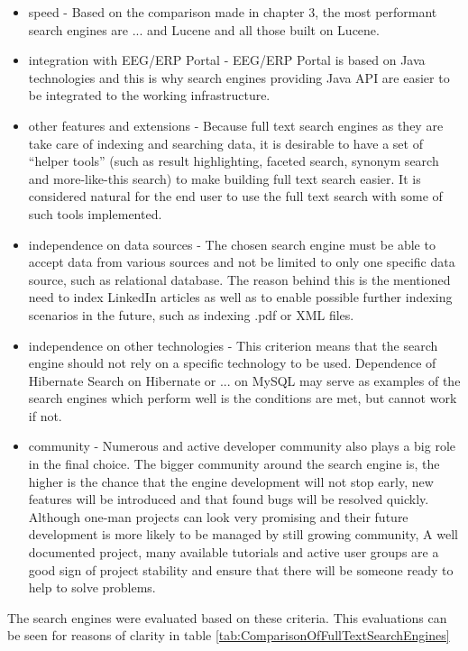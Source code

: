 \documentclass[12pt, oneside, a4paper]{book}
\begin{document}
\begin{itemize}
	\item speed - Based on the comparison made in chapter 3, the most performant search engines are ... and Lucene and all those built on Lucene.
	\item integration with EEG/ERP Portal - EEG/ERP Portal is based on Java technologies and this is why search engines providing Java API are easier to be integrated to the working infrastructure.
	\item other features and extensions - Because full text search
engines as they are take care of indexing and searching data, it is desirable to have a set of ``helper tools'' (such as result highlighting, faceted search, synonym search and more-like-this search) to make building full text search easier. It is considered natural for the end user to use the full text search with some of such tools implemented. 
	\item independence on data sources - The chosen search engine must be able to accept data from various sources and not be limited to only one specific data source, such as relational database. The reason behind this is the mentioned need to index LinkedIn articles as well as to enable possible further indexing scenarios in the future, such as indexing .pdf or XML files.
	\item independence on other technologies - This criterion means that the search engine should not rely on a specific technology to be used. Dependence of Hibernate Search on Hibernate or ... on MySQL may serve as examples of the search engines which perform well is the conditions are met, but cannot work if not. 
	\item community - Numerous and active developer community also plays a big role in the final choice. The bigger community around the search engine is, the higher is the chance that the engine development will not stop early, new features will be introduced and that found bugs will be resolved quickly. Although one-man projects can look very promising and their future development is more likely to be managed by still growing community, 
A well documented project, many available tutorials and active user groups are a good sign of project stability and ensure that there will be someone ready to help to solve problems.

\end{itemize}

The search engines were evaluated based on these criteria. This evaluations can be seen for reasons of clarity in table \ref{tab:ComparisonOfFullTextSearchEngines}
\end{document}

